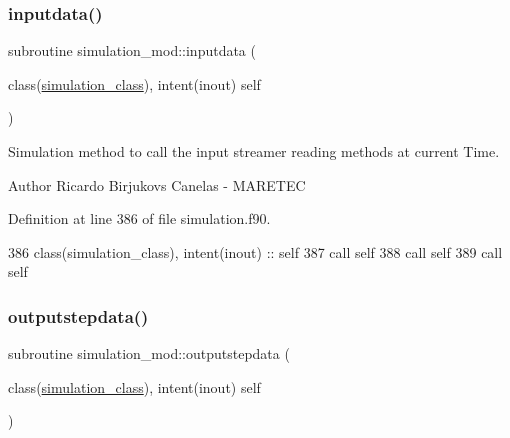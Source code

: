 \subsubsection{\texorpdfstring{inputdata()}{inputdata()}}
{\footnotesize\ttfamily subroutine simulation\+\_\+mod\+::inputdata (\begin{DoxyParamCaption}\item[{class(\mbox{\hyperlink{structsimulation__mod_1_1simulation__class}{simulation\+\_\+class}}), intent(inout)}]{self }\end{DoxyParamCaption})\hspace{0.3cm}{\ttfamily [private]}}



Simulation method to call the input streamer reading methods at current Time. 

\begin{DoxyAuthor}{Author}
Ricardo Birjukovs Canelas -\/ M\+A\+R\+E\+T\+EC 
\end{DoxyAuthor}


Definition at line 386 of file simulation.\+f90.


\begin{DoxyCode}
386     \textcolor{keywordtype}{class}(simulation\_class), \textcolor{keywordtype}{intent(inout)} :: self
387     \textcolor{keyword}{call }self%
388     \textcolor{keyword}{call }self%
389     \textcolor{keyword}{call }self%
\end{DoxyCode}
\mbox{\label{namespacesimulation__mod_a5735e9ecb39f15061f3d766b0de7809d}} 
\subsubsection{\texorpdfstring{outputstepdata()}{outputstepdata()}}
{\footnotesize\ttfamily subroutine simulation\+\_\+mod\+::outputstepdata (\begin{DoxyParamCaption}\item[{class(\mbox{\hyperlink{structsimulation__mod_1_1simulation__class}{simulation\+\_\+class}}), intent(inout)}]{self }\end{DoxyParamCaption})\hspace{0.3cm}{\ttfamily [private]}}



